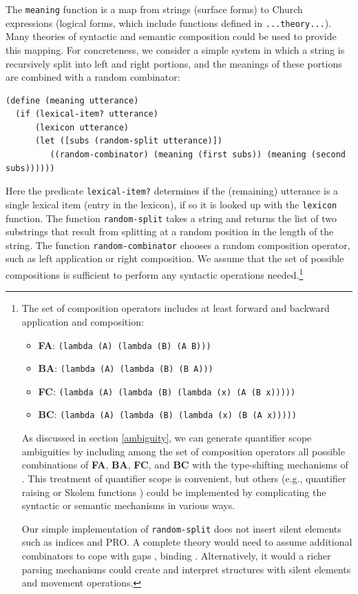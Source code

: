 \documentclass[12pt]{article}
\begin{document}
The \lstinline{meaning} function is a map from strings (surface forms) to Church expressions (logical forms, which include functions defined in \lstinline{...theory...}).
Many theories of syntactic and semantic composition could be used to provide this mapping. 
For concreteness, we consider a simple system in which a string is recursively split into left and right portions, and the meanings of these portions are combined with a random combinator:
\begin{lstlisting}
(define (meaning utterance)
  (if (lexical-item? utterance)
      (lexicon utterance)
      (let ([subs (random-split utterance)])
         ((random-combinator) (meaning (first subs)) (meaning (second subs))))))
\end{lstlisting}
Here the predicate \lstinline{lexical-item?} determines if the (remaining) utterance is a single lexical item (entry in the lexicon), if so it is looked up with the \lstinline{lexicon} function.
The function \lstinline{random-split} takes a string and returns the list of two substrings that result from splitting at a random position in the length of the string.
The function \lstinline{random-combinator} chooses a random composition operator, such as left application or right composition. 
We assume that the set of possible compositions is sufficient to perform any syntactic operations needed.\footnote{\label{composition}The set of composition operators includes at least forward and backward application and composition:
\begin{itemize}
\item \textbf{FA}: \lstinline{(lambda (A) (lambda (B) (A B)))}
\item \textbf{BA}: \lstinline{(lambda (A) (lambda (B) (B A)))}
\item \textbf{FC}: \lstinline{(lambda (A) (lambda (B) (lambda (x) (A (B x)))))}
\item \textbf{BC}: \lstinline{(lambda (A) (lambda (B) (lambda (x) (B (A x)))))}
\end{itemize}
As discussed in section \ref{ambiguity}, we can generate quantifier scope ambiguities by including among the set of composition operators all possible combinations of \textbf{FA}, \textbf{BA}, \textbf{FC}, and \textbf{BC} with the type-shifting mechanisms of \citet{hendriks93}. 
This treatment of quantifier scope is convenient, but others (e.g., quantifier raising or Skolem functions \cite{steedman12} ) could be implemented by complicating the syntactic or semantic mechanisms in various ways. 

Our simple implementation of \lstinline{random-split} does not insert silent elements such as indices and PRO. 
A complete theory would need to assume additional combinators to cope with gaps \citep{steedman00}, binding \citep{jacobson99,barker05}. 
Alternatively, it would a richer parsing mechanisms could create and interpret structures with silent elements and movement operations.}
\end{document}
